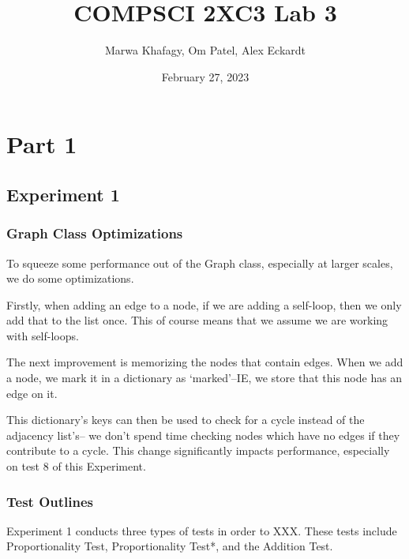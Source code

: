 \documentclass[12pt]{article}
\title{COMPSCI 2XC3 Lab 3}
\author{Marwa Khafagy, Om Patel, Alex Eckardt}
\date{February 27, 2023}
\begin{document}
\maketitle

\newpage
\tableofcontents

\newpage
\listoffigures


%
%
%
%
\newpage
\section{Part 1}
\subsection{Experiment 1}

\subsubsection{Graph Class Optimizations}

To squeeze some performance out of the Graph class, especially at larger scales, we do some optimizations.

Firstly, when adding an edge to a node, if we are adding a self-loop, then we only add that to the list once. This of course means that we assume we are working with self-loops.

The next improvement is memorizing the nodes that contain edges. When we add a node, we mark it in a dictionary as `marked'--IE, we store that this node has an edge on it.

This dictionary's keys can then be used to check for a cycle instead of the adjacency list's-- we don't spend time checking nodes which have no edges if they contribute to a cycle. This change significantly impacts performance, especially on test 8 of this Experiment.

\subsubsection{Test Outlines}

Experiment 1 conducts three types of tests in order to XXX\@. These tests include Proportionality Test, Proportionality Test*, and the Addition Test.
\end{document}
